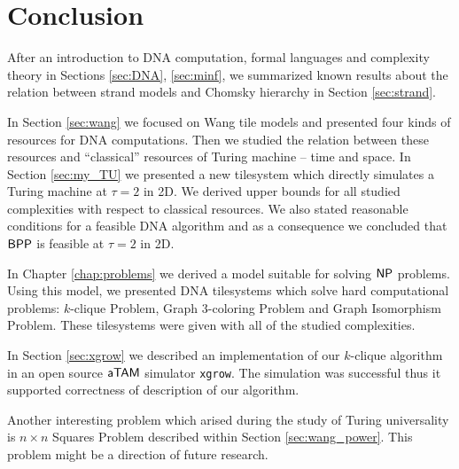\cleardoublepage{}   %
\chapter*{Conclusion}

After an introduction to DNA computation, formal languages and complexity theory in Sections \ref{sec:DNA}, \ref{sec:minf}, we summarized known results about the relation between strand models and Chomsky hierarchy in Section \ref{sec:strand}.

In Section \ref{sec:wang} we focused on Wang tile models and presented four kinds of resources for DNA computations. Then we studied the relation between these resources and ``classical'' resources of Turing machine -- time and space. In Section \ref{sec:my_TU} we presented a new tilesystem which directly simulates a Turing machine at $\tau = 2$ in 2D. We derived upper bounds for all studied complexities with respect to classical resources. We also stated reasonable conditions for a feasible DNA algorithm and as a consequence we concluded that $\mathsf{BPP}$ is feasible at $\tau = 2$ in 2D.

In Chapter \ref{chap:problems} we derived a model suitable for solving $\mathsf{NP}$ problems. Using this model, we presented DNA tilesystems which solve hard computational problems: $k$-clique Problem, Graph 3-coloring Problem and Graph Isomorphism Problem. These tilesystems were given with all of the studied complexities.

In Section \ref{sec:xgrow} we described an implementation of our $k$-clique algorithm in an open source $\mathsf{aTAM}$ simulator {\tt xgrow}. The simulation was successful thus it supported correctness of description of our algorithm.   %

Another interesting problem which arised during the study of Turing universality is $n\times n$ Squares Problem described within Section \ref{sec:wang_power}. This problem might be a direction of future research.

